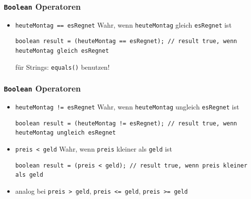 \documentclass{../../presentation}
\begin{document}
\begin{frame}[fragile]
	\frametitle{\texttt{Boolean} Operatoren}
	\pause

	\begin{itemize}
		\item<2->\texttt{heuteMontag == esRegnet} \quad Wahr, wenn \texttt{heuteMontag} gleich \texttt{esRegnet} ist
		      \begin{verbatim}
boolean result = (heuteMontag == esRegnet); // result true, wenn heuteMontag gleich esRegnet
    \end{verbatim}
		      \achtung  für Strings: \texttt{equals()} benutzen!

	\end{itemize}
\end{frame}

\begin{frame}[fragile]
	\frametitle{\texttt{Boolean} Operatoren}
	\pause

	\begin{itemize}
		\item<1->\texttt{heuteMontag != esRegnet} \quad Wahr, wenn \texttt{heuteMontag} ungleich \texttt{esRegnet} ist
		      \begin{verbatim}
boolean result = (heuteMontag != esRegnet); // result true, wenn heuteMontag ungleich esRegnet
    \end{verbatim}

		\item<3->\texttt{preis < geld} \quad Wahr, wenn \texttt{preis} kleiner als \texttt{geld} ist
		      \begin{verbatim}
boolean result = (preis < geld); // result true, wenn preis kleiner als geld
    \end{verbatim}

		\item<4->analog bei \texttt{preis > geld}, \texttt{preis <= geld}, \texttt{preis >= geld} \quad
	\end{itemize}
\end{frame}
\end{document}
